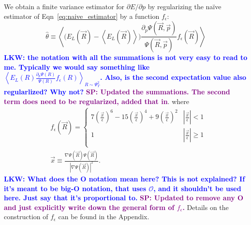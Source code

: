 \documentclass[twocolumn]{revtex4-1}
\newcommand{\lucas}[1]{\textbf{\textcolor{blue}{LKW: #1}}}
\newcommand{\shivesh}[1]{\textbf{\textcolor{purple}{SP: #1}}}
\begin{document}
We obtain a finite variance estimator for $\partial E/\partial p$ by regularizing the na\"ive estimator of Eqn~\ref{eq:naive_estimator} by a function $f_\epsilon$:
\begin{equation}
\hat{\theta} \equiv \left\langle \Big(E_L(\vec{R})  - \left\langle E_L(\vec{R}) \right \rangle\Big)\frac{\partial_p \Psi(\vec{R}, \vec{p})}{\Psi(\vec{R}, \vec{p})} f_\epsilon(\vec{R}) \right\rangle
\label{eq:regularized_estimator}
\end{equation}
\lucas{the notation with all the summations is not very easy to read to me. Typically we would say something like $\left\langle E_L(R) \frac{\partial_p \Psi(R)}{\Psi(R)} f_\epsilon(R) \right\rangle_{R\sim\Psi_T^2}$. Also, is the second expectation value also regularlized? Why not?}
\shivesh{Updated the summations. The second term does need to be regularized, added that in}.
where 
\begin{equation}
\begin{split}
&f_\epsilon(\vec{R}) = \begin{cases} 
     7(\frac{\vec{x}}{\epsilon})^6 - 15(\frac{\vec{x}}{\epsilon})^4 + 9(\frac{\vec{x}}{\epsilon})^2 & |\frac{\vec{x}}{\epsilon}| < 1 \\
      1 & |\frac{\vec{x}}{\epsilon}| \ge 1 \\
   \end{cases}\\ 
 &\vec{x} \equiv \frac{\nabla \Psi(\vec{R}) \Psi(\vec{R})}{|\nabla \Psi(\vec{R})|^2}.
\end{split}
\label{eq:regularizing_function}
\end{equation} 
\lucas{What does the O notation mean here? This is not explained? If it's meant to be big-O notation, that uses $\mathcal{O}$, and it shouldn't be used here. Just say that it's proportional to.} 
\shivesh{Updated to remove any O and just explicitly write down the general form of $f_\epsilon$.}
Details on the construction of $f_\epsilon$ can be found in the Appendix.
\end{document}
